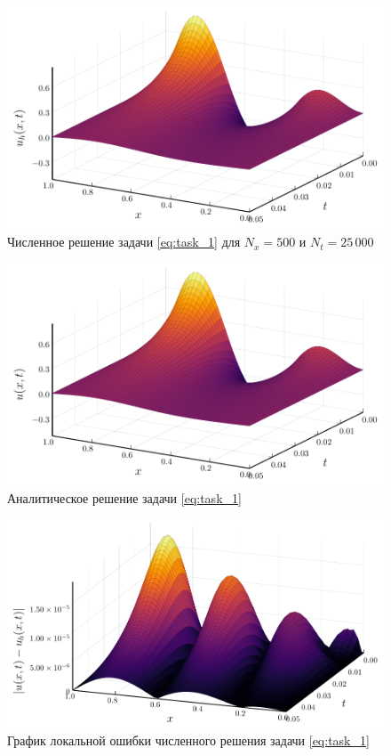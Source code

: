\begin{figure}
    \centering
    \includegraphics{Разностные_схемы_на_статических_сетках/Программный_код_примеры_расчётов/explicit_scheme/problem_1_explicit_surface.pdf}
    \caption{Численное решение задачи \eqref{eq:task_1} для $N_x = 500$ и $N_t = 25\,000$}
    \label{fig:problem_1_explicit_surface}
\end{figure}
\begin{figure}
    \centering
    \includegraphics{Разностные_схемы_на_статических_сетках/Программный_код_примеры_расчётов/explicit_scheme/problem_1_analytic_surface.pdf}
    \caption{Аналитическое решение задачи \eqref{eq:task_1}}
    \label{fig:problem_1_analytic_surface}
\end{figure}
\begin{figure}
    \centering
    \includegraphics{Разностные_схемы_на_статических_сетках/Программный_код_примеры_расчётов/explicit_scheme/problem_1_explicit_error_surface.pdf}
    \caption{График локальной ошибки численного решения задачи \eqref{eq:task_1}}
    \label{fig:problem_1_explicit_error_surface}
\end{figure}
